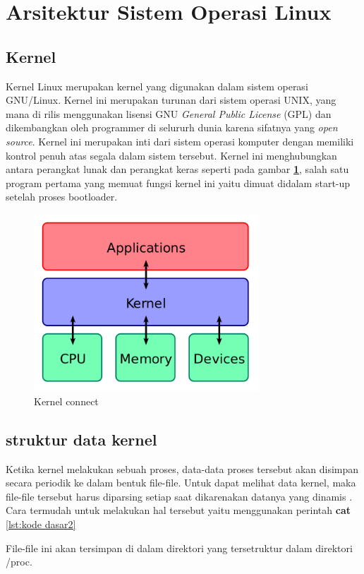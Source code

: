 \section{Arsitektur Sistem Operasi Linux}
\subsection{Kernel}
	Kernel Linux merupakan kernel yang digunakan dalam sistem operasi GNU/Linux. Kernel ini merupakan turunan dari sistem operasi UNIX, yang mana di rilis menggunakan lisensi GNU \textit{General Public License} (GPL) dan dikembangkan oleh programmer di selururh dunia karena sifatnya yang \textit{open source}. Kernel ini merupakan inti dari sistem operasi komputer dengan memiliki kontrol penuh atas segala dalam sistem tersebut. Kernel ini menghubungkan antara perangkat lunak dan perangkat keras seperti pada gambar \textbf{\ref{kernel}}, salah satu program pertama yang memuat fungsi kernel ini yaitu dimuat didalam start-up setelah proses bootloader.

\begin{figure}[!htbp]
\centerline{\includegraphics[width=0.75\textwidth]{Figures/Kernel_Layout.png}}
\caption{Kernel connect}
\label{kernel}
\end{figure}



\subsection{struktur data kernel}
	Ketika kernel melakukan sebuah proses, data-data proses tersebut akan disimpan secara periodik ke dalam bentuk file-file. Untuk dapat melihat data kernel, maka file-file tersebut harus diparsing setiap saat dikarenakan datanya yang dinamis \cite{raharja2001pengenalan}. Cara termudah untuk melakukan hal tersebut yaitu menggunakan perintah \textbf{cat} \ref{lst:kode dasar2}


File-file ini akan tersimpan di dalam direktori yang tersetruktur dalam direktori /proc.